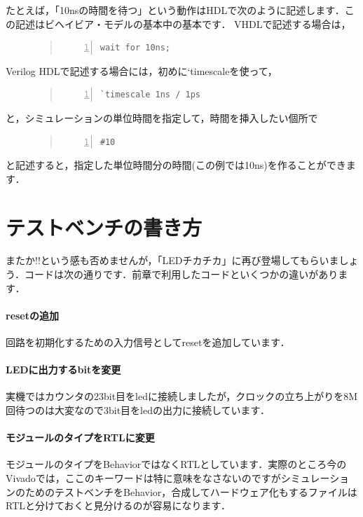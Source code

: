 \documentclass[a4paper,dvipdfmx]{jsarticle}
\begin{document}
たとえば，「10nsの時間を待つ」という動作はHDLで次のように記述します．この記述はビヘイビア・モデルの基本中の基本です．
VHDLで記述する場合は，
\begin{figure}[H]
\begin{quote}
\begin{Verbatim}[frame=single, numbers=left, baselinestretch=0.8]
wait for 10ns;
\end{Verbatim}
\end{quote}
\end{figure}
Verilog HDLで記述する場合には，初めに`timescaleを使って，
\begin{figure}[H]
\begin{quote}
\begin{Verbatim}[frame=single, numbers=left, baselinestretch=0.8]
`timescale 1ns / 1ps
\end{Verbatim}
\end{quote}
\end{figure}
と，シミュレーションの単位時間を指定して，時間を挿入したい個所で
\begin{figure}[H]
\begin{quote}
\begin{Verbatim}[frame=single, numbers=left, baselinestretch=0.8]
#10
\end{Verbatim}
\end{quote}
\end{figure}
と記述すると，指定した単位時間分の時間(この例では10ns)を作ることができます．

\section{テストベンチの書き方}
またか!!という感も否めませんが，「LEDチカチカ」に再び登場してもらいましょう．コードは次の通りです．前章で利用したコードといくつかの違いがあります．

\paragraph{resetの追加}
回路を初期化するための入力信号としてresetを追加しています．

\paragraph{LEDに出力するbitを変更}
実機ではカウンタの23bit目をledに接続しましたが，クロックの立ち上がりを8M回待つのは大変なので3bit目をledの出力に接続しています．

\paragraph{モジュールのタイプをRTLに変更}
モジュールのタイプをBehaviorではなくRTLとしています．実際のところ今のVivadoでは，ここのキーワードは特に意味をなさないのですがシミュレーションのためのテストベンチをBehavior，合成してハードウェア化もするファイルはRTLと分けておくと見分けるのが容易になります．
\end{document}
